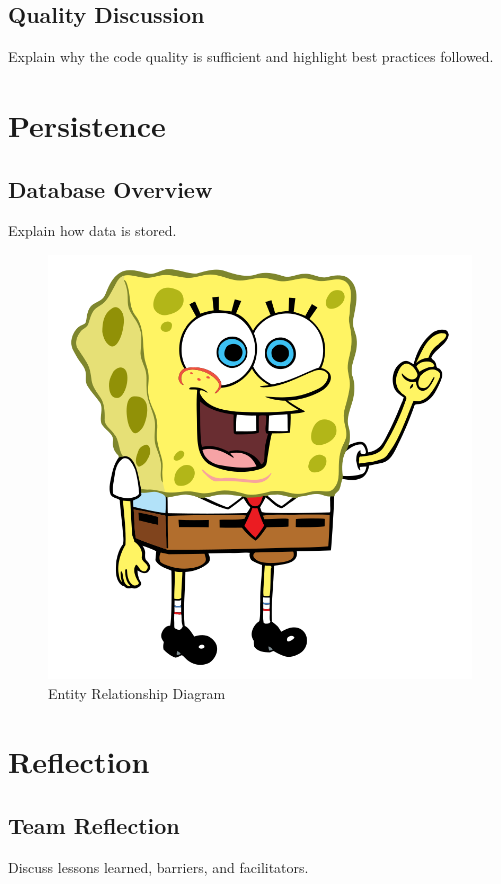 \documentclass[12pt]{article}
\begin{document}
\subsection{Quality Discussion}
Explain why the code quality is sufficient and highlight best practices followed.

\newpage
\section{Persistence}
\FloatBarrier

\subsection{Database Overview}
Explain how data is stored.
\begin{figure}[H] 
    \centering
    \includegraphics[width=\textwidth]{erd.png}
    \caption{Entity Relationship Diagram}
    \label{fig:erd}
\end{figure}

\newpage
\section{Reflection}

\subsection{Team Reflection}
Discuss lessons learned, barriers, and facilitators.
\end{document}
